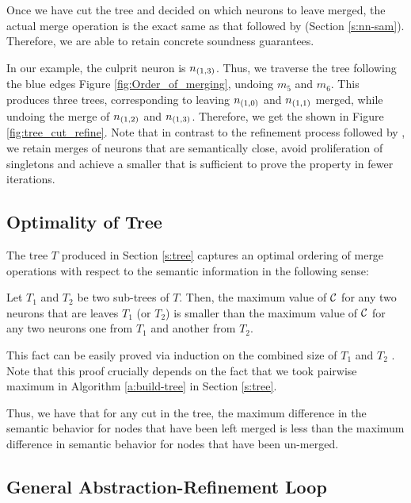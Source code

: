 Once we have cut the tree and decided on which neurons to leave merged, the
actual merge operation is the exact same as that followed by \cite{cegar-nn}
(Section \ref{s:nn-sam}). Therefore, we are able to retain concrete soundness
guarantees.

In our example, the culprit neuron is $n_{(1,3)}$. Thus, we traverse the tree
following the blue edges Figure \ref{fig:Order_of_merging}, undoing $m_5$ and
$m_6$. This produces three trees, corresponding to leaving $n_{(1,0)}$ and
$n_{(1,1)}$ merged, while undoing the merge of $n_{(1,2)}$ and $n_{(1,3)}$.
Therefore, we get the \abs shown in Figure \ref{fig:tree_cut_refine}. Note
that in contrast to the refinement process followed by \cite{cegar-nn} , we retain merges of neurons that are semantically close, avoid
proliferation of singletons and achieve a smaller \abs that is sufficient to
prove the property in fewer iterations.



\subsection{Optimality of Tree}
\label{s:optimal-tree}

The tree $T$ produced in Section \ref{s:tree} captures an optimal ordering of
merge operations with respect to the semantic information in the following
sense:

Let $T_1$ and $T_2$ be two sub-trees of $T$. Then, the maximum value of $\mathcal{C}$
for any two neurons that are leaves $T_1$ (or $T_2$) is smaller than the maximum
value of $\mathcal{C}$ for any two neurons one from $T_1$ and another from $T_2$.

This fact can be easily proved via induction on the combined size of $T_1$ and
$T_2$ . Note that this proof crucially depends on the fact
that we took pairwise maximum in Algorithm \ref{a:build-tree} in Section
\ref{s:tree}.

Thus, we have that for any cut in the tree, the
maximum difference in the semantic behavior for nodes that have been left merged
is less than the maximum difference in semantic behavior for nodes that have
been un-merged.

\subsection{General Abstraction-Refinement Loop}
\label{s:abs-ref-fw}

